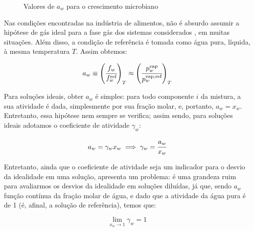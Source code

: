 \documentclass[
	12pt,				%
	openright,
	twoside,
	a4paper,			%
	english,			%
	french,				%
	spanish,			%
	brazil				%
	]{abntex2}
\begin{document}
\begin{figure}[h]
	\caption{Valores de $a_w$ para o crescimento microbiano}
	\label{fig:germ}
\end{figure}

Nas condições encontradas na indústria de alimentos, não é absurdo assumir a
hipótese de gás ideal para a fase gás dos sistemas
considerados \cite{canovas2007}, em muitas situações. Além disso, a condição de
referência é tomada como água pura, líquida, à mesma temperatura $T$. Assim
obtemos:

\begin{equation}
	\label{eq:def_atv}
	a_w \equiv \left(\cfrac{f_w}{f^\text{ref}_w}\right)_T%
		\approx \left(\cfrac{p^\text{vap}_w}{p^\text{vap,ref}_w}\right)_T
\end{equation}

Para soluções ideais, obter $a_w$ é simples: para todo componente $i$ da
mistura, a sua atividade é dada, simplesmente por sua fração molar, e, portanto,
$a_w = x_w$. Entretanto, essa hipótese nem sempre se verifica; assim sendo,
para soluções ideais adotamos o coeficiente de atividade $\gamma_w$:

\begin{equation}
	a_w = \gamma_wx_w \implies \gamma_w = \cfrac{a_w}{x_w}
\end{equation}

Entretanto, ainda que o coeficiente de atividade seja um indicador para o
desvio da idealidade em uma solução, apresenta um problema: é uma grandeza ruim
para avaliarmos os desvios da idealidade em soluções diluídas, já que, sendo
$a_w$ função contínua da fração molar de água, e dado que a atividade da água
pura é de 1 (é, afinal, a solução de referência), temos que:

\begin{equation}
	\lim_{x_w \to 1}\gamma_w = 1
\end{equation}
\end{document}
